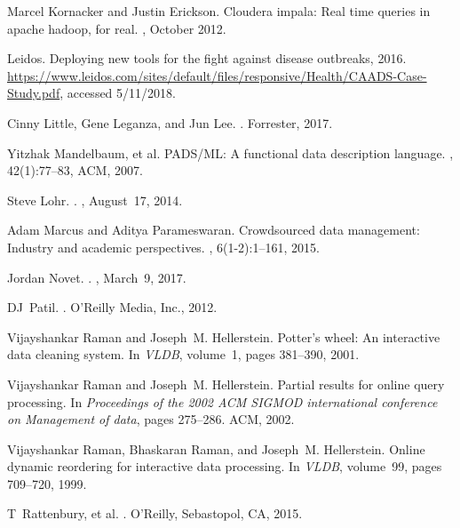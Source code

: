 \documentclass[11pt]{article}
\begin{document}
\begin{small}
\begin{thebibliography}{10}
Marcel Kornacker and Justin Erickson.
\newblock Cloudera impala: Real time queries in apache hadoop, for real.
, October 2012.

Leidos.
\newblock Deploying new tools for the fight against disease outbreaks, 2016.
\newblock
  \url{https://www.leidos.com/sites/default/files/responsive/Health/CAADS-Case-Study.pdf},
  accessed 5/11/2018.

Cinny Little, Gene Leganza, and Jun Lee.
.
\newblock Forrester, 2017.

Yitzhak Mandelbaum, et al.
\newblock PADS/ML: A functional data description language.
, 42(1):77--83, ACM, 2007.

Steve Lohr.
.
, August~17, 2014.

Adam Marcus and Aditya Parameswaran.
\newblock Crowdsourced data management: Industry and academic perspectives.
,
  6(1-2):1--161, 2015.

Jordan Novet.
.
, March~9, 2017.

DJ~Patil.
.
\newblock O'Reilly Media, Inc., 2012.

Vijayshankar Raman and Joseph~M. Hellerstein.
\newblock Potter's wheel: An interactive data cleaning system.
\newblock In {\em VLDB}, volume~1, pages 381--390, 2001.

Vijayshankar Raman and Joseph~M. Hellerstein.
\newblock Partial results for online query processing.
\newblock In {\em Proceedings of the 2002 ACM SIGMOD international conference
  on Management of data}, pages 275--286. ACM, 2002.

Vijayshankar Raman, Bhaskaran Raman, and Joseph~M. Hellerstein.
\newblock Online dynamic reordering for interactive data processing.
\newblock In {\em VLDB}, volume~99, pages 709--720, 1999.

T~Rattenbury, et al.%
.
\newblock O'Reilly, Sebastopol, CA, 2015.


\end{thebibliography}
\end{small}
\end{document}
